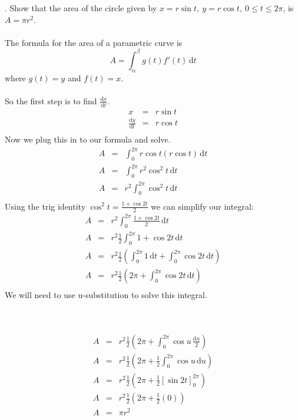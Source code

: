 \documentclass[11pt]{exam}
\begin{document}
. Show that the area of the circle given by $x=r\sin t,\ y=r\cos t,\ 0\leq t\leq 2\pi$, is $A = \pi r^2$. \\
\\
The formula for the area of a parametric curve is
$$A = \int_\alpha^\beta \! g(t) f'(t) \, \mathrm{d}t$$
where $g(t) = y$ and $f(t) = x$.\\\\
So the first step is to find $\frac{\mathrm{d}x}{\mathrm{d}t}$.
\begin{eqnarray*}
  	x&=&r\sin t \\
  	\frac{\mathrm{d}y}{\mathrm{d}t}&=& r\cos t \\
\end{eqnarray*}
Now we plug this in to our formula and solve.\\
\begin{eqnarray*}
	A &=& \int_0^{2\pi} \! r\cos t(r\cos t) \, \mathrm{d}t \\
	A &=& \int_0^{2\pi} \! r^2\cos^2 t \, \mathrm{d}t \\
	A &=& r^2 \int_0^{2\pi} \! \cos^2 t \, \mathrm{d}t \\
\end{eqnarray*} 
Using the trig identity $\cos^2 t = \frac{1+\cos {2t}}{2}$ we can simplify our integral: \\
\begin{eqnarray*}
	A &=& r^2 \int_0^{2\pi} \! \frac{1+\cos {2t}}{2} \, \mathrm{d}t \\
	A &=& r^2 \frac{1}{2} \int_0^{2\pi} \! 1+\cos {2t} \, \mathrm{d}t \\
	A &=& r^2 \frac{1}{2} \left(\int_0^{2\pi} \! 1 \, \mathrm{d}t + \int_0^{2\pi} \! \cos {2t} \, \mathrm{d}t \right) \\
	A &=& r^2 \frac{1}{2} \left(2\pi + \int_0^{2\pi} \! \cos {2t} \, \mathrm{d}t \right) \\
\end{eqnarray*}
We will need to use u-substitution to solve this integral.\\\\
\\
\noindent
\begin{minipage}{.5\linewidth}
	\begin{eqnarray*}
		 A &=& r^2 \frac{1}{2} \left(2\pi + \int_0^{2\pi} \! \cos {u} \, \frac{\mathrm{d}u}{2} \right) \\
		 A &=& r^2 \frac{1}{2} \left(2\pi + \frac{1}{2} \int_0^{2\pi} \! \cos {u} \, \mathrm{d}u \right) \\
		 A &=& r^2 \frac{1}{2} \left(2\pi + \frac{1}{2} [\sin {2t}]_0^{2\pi} \right) \\
		 A &=& r^2 \frac{1}{2} \left(2\pi + \frac{1}{2} (0) \right) \\
		 A &=& \pi r^2 \\
	\end{eqnarray*}
\end{minipage}
\end{document}
